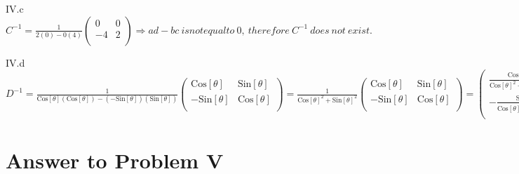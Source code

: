 \documentclass[11pt,a4paper]{article}
\begin{document}
\hfill \break
IV.c\\
$
C^{-1}= \frac{1}{2(0)-0(4)}\left(
\begin{array}{cc}
 0 & 0 \\
 -4 & 2 \\
\end{array}
\right)\Rightarrow ad-bc\ is not equal to\ 0,\ therefore\ C^{-1}\ does\ not\ exist.
$

\hfill \break
IV.d\\
$
D^{-1}= \frac{1}{\text{Cos}[\theta ](\text{Cos}[\theta ])-(-\text{Sin}[\theta ])(\text{Sin}[\theta ])}\left(
\begin{array}{cc}
 \text{Cos}[\theta ] & \text{Sin}[\theta ] \\
 -\text{Sin}[\theta ] & \text{Cos}[\theta ] \\
\end{array}
\right)= \frac{1}{\text{Cos}[\theta ]^2+\text{Sin}[\theta ]^2}\left(
\begin{array}{cc}
 \text{Cos}[\theta ] & \text{Sin}[\theta ] \\
 -\text{Sin}[\theta ] & \text{Cos}[\theta ] \\
\end{array}
\right)= \left(
\begin{array}{cc}
 \frac{\text{Cos}[\theta ]}{\text{Cos}[\theta ]^2+\text{Sin}[\theta ]^2} & \frac{\text{Sin}[\theta ]}{\text{Cos}[\theta ]^2+\text{Sin}[\theta ]^2}
\\
 -\frac{\text{Sin}[\theta ]}{\text{Cos}[\theta ]^2+\text{Sin}[\theta ]^2} & \frac{\text{Cos}[\theta ]}{\text{Cos}[\theta ]^2+\text{Sin}[\theta ]^2}
\\
\end{array}
\right)
$

\clearpage
\section{Answer to Problem V}\label{sec:P05} %
\end{document}

